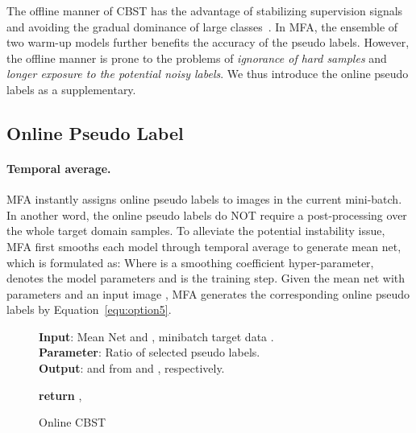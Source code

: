 \documentclass{bmvc2k}
\begin{document}
The offline manner of CBST has the advantage of stabilizing supervision signals and avoiding the gradual dominance of large classes~\cite{RN162}. In MFA, the ensemble of two warm-up models further benefits the accuracy of the pseudo labels. However, the offline manner is prone to the problems of \emph{ignorance of hard samples} \cite{RN204} and \emph{longer exposure to the potential noisy labels}. We thus introduce the online pseudo labels as a supplementary.

\subsection{Online Pseudo Label} \label{sec: online}
\paragraph{Temporal average.} MFA instantly assigns online pseudo labels to images in the current mini-batch. In another word, the online pseudo labels do NOT require a post-processing over the whole target domain samples. To alleviate the potential instability issue, MFA first smooths each model through temporal average to generate mean net, which is formulated as:
Where  is a smoothing coefficient hyper-parameter,  denotes the model parameters and  is the training step. Given the mean net with parameters  and an input image , MFA generates the corresponding online pseudo labels by Equation~\ref{equ:option5}.







\begin{wrapfigure}{R}{0.55\textwidth}
 \vspace{-9pt}
    \begin{minipage}{0.55\textwidth}
      \begin{algorithm}[H]
        \caption{Online CBST}
        \label{alg:cbst}
        \textbf{Input}: Mean Net  and , minibatch target data . \\
        \textbf{Parameter}: Ratio  of selected pseudo labels.\\
        \textbf{Output}:  and  from  and , respectively.
        \begin{algorithmic}
            \STATE 
            \STATE 
            \STATE 
            \STATE 
{}
\STATE 
            \STATE 
            \STATE 
            \STATE 
            \STATE 
            \STATE 
            \ENDFOR
            \ENDFOR
            \STATE \textbf{return} , 
        \end{algorithmic}
      \end{algorithm}
    \end{minipage}
\end{wrapfigure}
\end{document}
